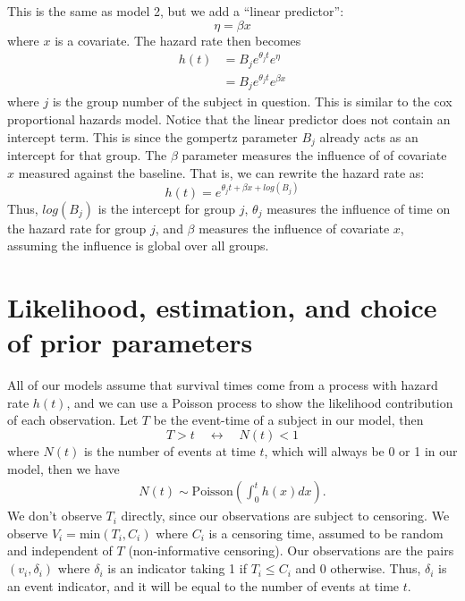 \documentclass[12pt]{article}
\begin{document}
This is the same as model 2, but we add a ``linear predictor'':
\begin{equation}
\eta =  \beta x
\end{equation}
where $x$ is a covariate.
The hazard rate then becomes
\begin{align*}
h(t)
&= B_j e^{\theta_j t} e^{\eta} \\
&= B_j e^{\theta_j t} e^{ \beta x }
\end{align*}
where $j$ is the group number of the subject in question. This is
similar to the cox proportional hazards model. Notice that the linear
predictor does not contain an intercept term. This is since the gompertz
parameter $B_j$ already acts as an intercept for that group. The
$\beta$ parameter measures the influence of of covariate $x$
measured against the baseline. That is, we can rewrite the hazard rate
as:
\begin{equation*}
h(t) = e^{ \theta_j t  + \beta x + log\left(B_j\right) }
\end{equation*}
Thus, $log\left(B_j\right)$ is the intercept for group $j$,
$\theta_j$ measures the influence of time on the hazard rate for group
$j$, and $\beta$ measures the influence of covariate $x$, assuming
the influence is global over all groups.

\section{Likelihood, estimation, and choice of prior
parameters}

All of our models assume that survival times come from a process with
hazard rate $h(t)$, and we can use a Poisson process to show the
likelihood contribution of each observation. Let $T$ be the event-time
of a subject in our model, then
\begin{equation*}
T > t \quad \longleftrightarrow \quad N(t) < 1
\end{equation*}
where $N(t)$ is the number of events at time $t$, which will always
be 0 or 1 in our model, then we have
\begin{align*}
N(t) \sim \text{Poisson}\left( \int_0^t{h(x)dx} \right)
\text{.}
\end{align*}
We don't observe $T_i$ directly, since our observations are subject to
censoring. We observe $V_i = \text{min}(T_i, C_i)$ where $C_i$ is a
censoring time, assumed to be random and independent of $T$
(non-informative censoring). Our observations are the pairs
$(v_i, \delta_i)$ where $\delta_i$ is an indicator taking 1 if
$T_i \leq C_i$ and 0 otherwise. Thus, $\delta_i$ is an event
indicator, and it will be equal to the number of events at time $t$.
\end{document}
